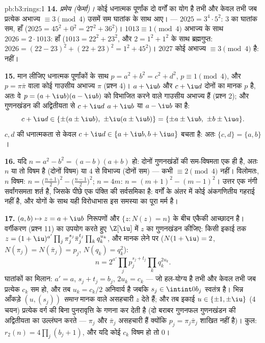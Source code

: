 \begin{solution}{pb:b3:rings:1}
\textbf{14.} \emph{प्रमेय (फेर्मा)।} कोई धनात्मक पूर्णांक दो वर्गों
का योग है तभी और केवल तभी जब प्रत्येक अभाज्य $\equiv 3 \pmod 4$ उसमें सम घातांक
के साथ आए। --- $2025 = 3^4 \cdot 5^2$: $3$ का घातांक सम, हाँ ($2025 = 45^2 + 0^2 = 27^2 + 36^2$)। $1013 \equiv 1 \pmod 4$ अभाज्य
के साथ $2026 = 2 \cdot 1013$: हाँ ($1013 = 22^2 + 23^2$, और $2 = 1^2+1^2$ के साथ ब्रह्मगुप्त: $2026 = (22 - 23)^2 + (22 + 23)^2 = 1^2 + 45^2$)। $2027$
कोई अभाज्य $\equiv 3 \pmod 4$ है: नहीं।

\textbf{15.} मान लीजिए धनात्मक पूर्णांकों के साथ $p = a^2 + b^2 = c^2 + d^2$, $p \equiv 1 \pmod 4$, और
$p = \pi\bar\pi$ वाला कोई गाउसीय अभाज्य $\pi$ (प्रश्न 4)। $a + \iu b$ और $c + \iu d$ दोनों
का मानक $p$ है, अतः वे $p = (a+\iu b)(a - \iu b)$ को विभाजित करने वाले गाउसीय अभाज्य
हैं (प्रश्न 2); और गुणनखंडन की अद्वितीयता से $c +
\iu d$ $a + \iu b$ या $a - \iu b$
का  है:
\[
c + \iu d \in \{\pm(a \pm \iu b),\ \pm\iu(a \pm \iu b)\}
= \{\pm a \pm \iu b,\ \pm b \pm \iu a\}.
\]
$c, d$ की धनात्मकता से केवल $c + \iu d \in \{a + \iu b, b + \iu
a\}$ बचता है: अतः $\{c, d\} = \{a, b\}$।

\textbf{16.} यदि $n = a^2 - b^2 = (a-b)(a+b)$ हो: दोनों गुणनखंडों की सम-विषमता एक ही है,
अतः $n$ या तो विषम है (दोनों विषम) या $4$ से विभाज्य (दोनों सम)
--- कभी $\equiv 2 \pmod 4$ नहीं। विलोमतः, $n$ विषम: $n = \bigl(\frac{n+1}2\bigr)^2 -
\bigl(\frac{n-1}2\bigr)^2$; $n = 4m$: $n = (m+1)^2 - (m-1)^2$। उत्तर
एक नंगी सर्वांगसमता शर्त है, जिसके पीछे एक पंक्ति की सर्वसमिका है:
वर्गों के अंतर में कोई अंकगणितीय गहराई नहीं है, और योगों के साथ यही
विरोधाभास इस समस्या का पूरा मर्म है।

\textbf{17.} $(a, b) \mapsto z = a + \iu b$ निरूपणों और $\{z : N(z) = n\}$ के बीच एकैकी आच्छादन है।
वर्गीकरण (प्रश्न 11) का उपयोग करते हुए  $\Z[\iu]$ में $z$ का
गुणनखंडन कीजिए: किसी इकाई तक $z = (1+\iu)^{a'}\prod_j\pi_j^{s_j}\bar\pi_j^{t_j}
\prod_kq_k^{u_k}$, और मानक लेने पर ($N(1+\iu) = 2$, $N(\pi_j) = N(\bar\pi_j) = p_j$,
$N(q_k) = q_k^2$):
\[
n = 2^{a'}\prod_jp_j^{s_j + t_j}\prod_kq_k^{2u_k} .
\]
घातांकों का मिलान: $a' = a$, $s_j + t_j = b_j$, $2u_k = c_k$ --- जो हल-योग्य है तभी और
केवल तभी जब प्रत्येक $c_k$ सम हो, और तब $u_k = c_k/2$ अनिवार्य है जबकि
$s_j \in \intint0{b_j}$ स्वतंत्र है। भिन्न आँकड़े $(u, (s_j))$ \emph{समान} मानक वाले असहचारी
$z$ देते हैं; और तब इकाई $u \in \{\pm1, \pm\iu\}$ (4 चयन) प्रत्येक  वर्ग की
बिना पुनरावृत्ति के गणना कर देती है (दो बराबर गुणनफल गुणनखंडन की
अद्वितीयता का उल्लंघन करते --- $\pi_j$ और $\bar\pi_j$ असहचारी हैं क्योंकि
$p_j =
\pi_j\bar\pi_j$ शाखित नहीं है)। कुल: $r_2(n) =
4\prod_j(b_j + 1)$, और यदि कोई $c_k$ विषम हो तो $0$।


\end{solution}
